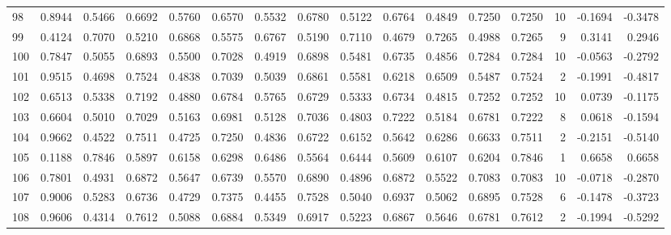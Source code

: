 \begin{tabular}{lrrrrrrrrrrrrrrr}
98  &      0.8944 &  0.5466 &  0.6692 &  0.5760 &  0.6570 &  0.5532 &  0.6780 &  0.5122 &  0.6764 &  0.4849 &   0.7250 &     0.7250 &     10 &                   -0.1694 &                    -0.3478 \\
99  &      0.4124 &  0.7070 &  0.5210 &  0.6868 &  0.5575 &  0.6767 &  0.5190 &  0.7110 &  0.4679 &  0.7265 &   0.4988 &     0.7265 &      9 &                    0.3141 &                     0.2946 \\
100 &      0.7847 &  0.5055 &  0.6893 &  0.5500 &  0.7028 &  0.4919 &  0.6898 &  0.5481 &  0.6735 &  0.4856 &   0.7284 &     0.7284 &     10 &                   -0.0563 &                    -0.2792 \\
101 &      0.9515 &  0.4698 &  0.7524 &  0.4838 &  0.7039 &  0.5039 &  0.6861 &  0.5581 &  0.6218 &  0.6509 &   0.5487 &     0.7524 &      2 &                   -0.1991 &                    -0.4817 \\
102 &      0.6513 &  0.5338 &  0.7192 &  0.4880 &  0.6784 &  0.5765 &  0.6729 &  0.5333 &  0.6734 &  0.4815 &   0.7252 &     0.7252 &     10 &                    0.0739 &                    -0.1175 \\
103 &      0.6604 &  0.5010 &  0.7029 &  0.5163 &  0.6981 &  0.5128 &  0.7036 &  0.4803 &  0.7222 &  0.5184 &   0.6781 &     0.7222 &      8 &                    0.0618 &                    -0.1594 \\
104 &      0.9662 &  0.4522 &  0.7511 &  0.4725 &  0.7250 &  0.4836 &  0.6722 &  0.6152 &  0.5642 &  0.6286 &   0.6633 &     0.7511 &      2 &                   -0.2151 &                    -0.5140 \\
105 &      0.1188 &  0.7846 &  0.5897 &  0.6158 &  0.6298 &  0.6486 &  0.5564 &  0.6444 &  0.5609 &  0.6107 &   0.6204 &     0.7846 &      1 &                    0.6658 &                     0.6658 \\
106 &      0.7801 &  0.4931 &  0.6872 &  0.5647 &  0.6739 &  0.5570 &  0.6890 &  0.4896 &  0.6872 &  0.5522 &   0.7083 &     0.7083 &     10 &                   -0.0718 &                    -0.2870 \\
107 &      0.9006 &  0.5283 &  0.6736 &  0.4729 &  0.7375 &  0.4455 &  0.7528 &  0.5040 &  0.6937 &  0.5062 &   0.6895 &     0.7528 &      6 &                   -0.1478 &                    -0.3723 \\
108 &      0.9606 &  0.4314 &  0.7612 &  0.5088 &  0.6884 &  0.5349 &  0.6917 &  0.5223 &  0.6867 &  0.5646 &   0.6781 &     0.7612 &      2 &                   -0.1994 &                    -0.5292 \\

\end{tabular}
